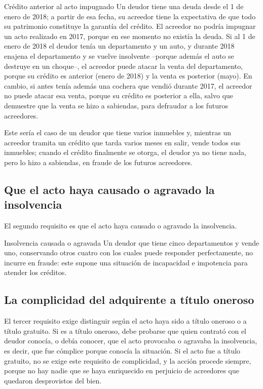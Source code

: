 \documentclass[12pt,oneside]{book}
\begin{document}
\begin{example}{Crédito anterior al acto impugnado}
Un deudor tiene una deuda desde el 1 de enero de 2018; a partir de esa fecha, su acreedor tiene la expectativa de que todo su patrimonio constituye la garantía del crédito. El acreedor no podría impugnar un acto realizado en 2017, porque en ese momento no existía la deuda. Si al 1 de enero de 2018 el deudor tenía un departamento y un auto, y durante 2018 enajena el departamento y se vuelve insolvente --porque además el auto se destruye en un choque--, el acreedor puede atacar la venta del departamento, porque su crédito es anterior (enero de 2018) y la venta es posterior (mayo). En cambio, si antes tenía además una cochera que vendió durante 2017, el acreedor no puede atacar esa venta, porque su crédito es posterior a ella, salvo que demuestre que la venta se hizo a sabiendas, para defraudar a los futuros acreedores.

Este sería el caso de un deudor que tiene varios inmuebles y, mientras un acreedor tramita un crédito que tarda varios meses en salir, vende todos sus inmuebles; cuando el crédito finalmente se otorga, el deudor ya no tiene nada, pero lo hizo a sabiendas, en fraude de los futuros acreedores.
\end{example}

\subsection{Que el acto haya causado o agravado la insolvencia}

El segundo requisito es que el acto haya causado o agravado la insolvencia.

\begin{example}{Insolvencia causada o agravada}
Un deudor que tiene cinco departamentos y vende uno, conservando otros cuatro con los cuales puede responder perfectamente, no incurre en fraude: este supone una situación de incapacidad e impotencia para atender los créditos.
\end{example}

\subsection{La complicidad del adquirente a título oneroso}

El tercer requisito exige distinguir según el acto haya sido a título oneroso o a título gratuito. Si es a título oneroso, debe probarse que quien contrató con el deudor conocía, o debía conocer, que el acto provocaba o agravaba la insolvencia, es decir, que fue cómplice porque conocía la situación. Si el acto fue a título gratuito, no se exige este requisito de complicidad, y la acción procede siempre, porque no hay nadie que se haya enriquecido en perjuicio de acreedores que quedaron desprovistos del bien.
\end{document}
